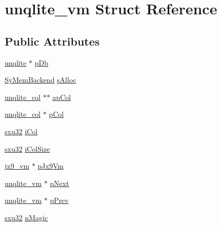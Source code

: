 \hypertarget{structunqlite__vm}{\section{unqlite\-\_\-vm Struct Reference}
\label{dd/d56/structunqlite__vm}
}
\subsection*{Public Attributes}
\begin{DoxyCompactItemize}
\item 
\hyperlink{structunqlite}{unqlite} $\ast$ \hyperlink{structunqlite__vm_a17c687ba904d5c928e79299f4b53f921}{p\-Db}
\item 
\hyperlink{struct_sy_mem_backend}{Sy\-Mem\-Backend} \hyperlink{structunqlite__vm_a222dae15f7d9a3e5c528e2c2a1da8643}{s\-Alloc}
\item 
\hyperlink{structunqlite__col}{unqlite\-\_\-col} $\ast$$\ast$ \hyperlink{structunqlite__vm_a6eb102a58edbd4a59bc626a5455e0636}{ap\-Col}
\item 
\hyperlink{structunqlite__col}{unqlite\-\_\-col} $\ast$ \hyperlink{structunqlite__vm_ac3dfb15fe7846bbb3404eeeaad0e1fb0}{p\-Col}
\item 
\hyperlink{unqlite_8c_abc5a8a3f345c200c98c485551f49666e}{sxu32} \hyperlink{structunqlite__vm_a9fdd8f1b6e253b75df244dc7b75122d6}{i\-Col}
\item 
\hyperlink{unqlite_8c_abc5a8a3f345c200c98c485551f49666e}{sxu32} \hyperlink{structunqlite__vm_a5590c2c83f95f8a77c710273a4e44a80}{i\-Col\-Size}
\item 
\hyperlink{structjx9__vm}{jx9\-\_\-vm} $\ast$ \hyperlink{structunqlite__vm_ac1112bdb8f71043546eea907768b9048}{p\-Jx9\-Vm}
\item 
\hyperlink{structunqlite__vm}{unqlite\-\_\-vm} $\ast$ \hyperlink{structunqlite__vm_a255bc025d2b6fb9d23a2e18436ee6bad}{p\-Next}
\item 
\hyperlink{structunqlite__vm}{unqlite\-\_\-vm} $\ast$ \hyperlink{structunqlite__vm_ad81bc194ac881691c77a99816c6a5779}{p\-Prev}
\item 
\hyperlink{unqlite_8c_abc5a8a3f345c200c98c485551f49666e}{sxu32} \hyperlink{structunqlite__vm_a3fb8ffeaeb86ba7ba0b2cc9c1d2469e8}{n\-Magic}
\end{DoxyCompactItemize}


